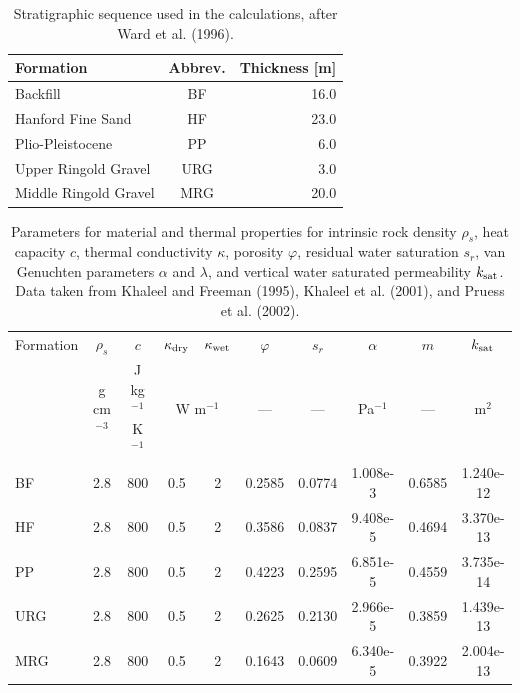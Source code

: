 \documentclass[12pt]{article}
\begin{document}
\begin{table}[H]\centering
\caption{Stratigraphic sequence used in the calculations, after Ward et al. (1996).}\label{t1}

\vspace{3mm}

\begin{tabular}{lcr}
\toprule
Formation & Abbrev. & Thickness [m]\\
\midrule
Backfill & BF & 16.0\\
Hanford Fine Sand & HF & 23.0\\
Plio-Pleistocene & PP & 6.0\\
Upper Ringold Gravel & URG & 3.0\\
Middle Ringold Gravel & MRG & 20.0\\
\bottomrule
\end{tabular}
\end{table}

\begin{table}[H]\centering
\caption{Parameters for material and thermal properties for intrinsic rock density $\rho_s$, heat capacity $c$, thermal conductivity $\kappa$, porosity $\varphi$, residual water saturation $s_r$, van Genuchten parameters $\alpha$ and $\lambda$, and vertical water saturated permeability $k_{\rm sat}$. Data taken from Khaleel and Freeman (1995), Khaleel et al. (2001), and Pruess et al. (2002).}\label{t2}

\vspace{3mm}

\begin{tabular}{lccccccccc}
\toprule
Formation & $\rho_s$ & $c$ & $\kappa_{\rm dry}$ & $\kappa_{\rm wet}$ & $\varphi$ & $s_r$ & $\alpha$ & $m$ & $k_{\rm sat}$\\
& g cm$^{-3}$ & J kg$^{-1}$ K$^{-1}$ & \multicolumn{2}{c}{W m$^{-1}$} & --- & --- & Pa$^{-1}$ & --- & m$^2$\\
\midrule
BF  & 2.8 & 800 & 0.5 & 2 & 0.2585 & 0.0774 & 1.008e-3 & 0.6585  &1.240e-12\\
HF  & 2.8 & 800 & 0.5 & 2 & 0.3586 & 0.0837 & 9.408e-5 & 0.4694  &3.370e-13\\
PP  & 2.8 & 800 & 0.5 & 2 & 0.4223 & 0.2595 & 6.851e-5 & 0.4559  &3.735e-14\\
URG & 2.8 & 800 & 0.5 & 2 & 0.2625 & 0.2130 & 2.966e-5 & 0.3859  &1.439e-13\\
MRG & 2.8 & 800 & 0.5 & 2 & 0.1643 & 0.0609 & 6.340e-5 & 0.3922  &2.004e-13\\
\bottomrule
\end{tabular}
\end{table}
\end{document}
